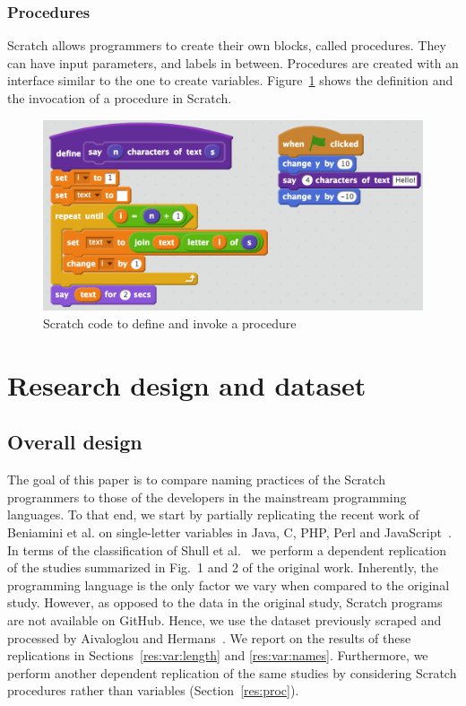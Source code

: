 \documentclass[conference]{IEEEtran}
\begin{document}
\subsubsection{Procedures} \label {sec:Scratch_func}
Scratch allows programmers to create their own blocks, called procedures. They can have input parameters, and labels in between. Procedures are created with an interface similar to the one to create variables. Figure~\ref{fig:procedures} shows the definition and the invocation of a procedure in Scratch.

\begin{figure}
  \begin{center}
  \includegraphics[scale=0.28]{fig/procedures2.png}
  \caption{Scratch code to define and invoke a procedure}
  \label{fig:procedures}
  \end{center}
\end{figure} 


\section{Research design and dataset}
\subsection{Overall design}
\label{sec:design}
The goal of this paper is to compare naming practices of the Scratch programmers to those of the developers in the mainstream programming languages. To that end, we start by partially replicating the recent work of Beniamini et al. on single-letter variables in Java, C, PHP, Perl and JavaScript~\cite{Beniamini}. 
In terms of the classification of Shull et al.~\cite{Shull2008} we perform a dependent replication of the studies summarized in Fig.~1 and 2 of the original work.  
Inherently, the programming language is the only factor we vary when compared to the original study. 
However, as opposed to the data in the original study, Scratch programs are not available on GitHub. 
Hence, we use the dataset previously scraped and processed by Aivaloglou and Hermans~\cite{Aivaloglou2016HowKC}. 
We report on the results of these replications in Sections~\ref{res:var:length} and \ref{res:var:names}.
%
Furthermore, we perform another dependent replication of the same studies by considering Scratch procedures rather than variables (Section~\ref{res:proc}).
\end{document}
